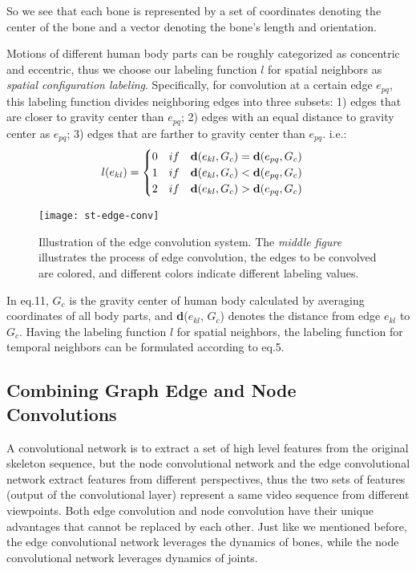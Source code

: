 \documentclass[a4paper,11pt]{article}
\begin{document}
So we see that each bone is represented by a set of coordinates denoting the center of the bone and a vector denoting the bone's length and orientation.

Motions of different human body parts can be roughly categorized as concentric and eccentric, thus we choose our labeling function $l$ for spatial neighbors as {\it spatial configuration labeling}. Specifically, for convolution at a certain edge $e_{pq}$, this labeling function divides neighboring edges into three subsets: 1) edges that are closer to gravity center than $e_{pq}$; 2) edges with an equal distance to gravity center as $e_{pq}$; 3) edges that are farther to gravity center than $e_{pq}$. i.e.:
\begin{equation} l(e_{kl})=
\begin{cases}
0 \quad if \quad {\bf d}(e_{kl}, G_c) = {\bf d}(e_{pq}, G_c)& \\
1 \quad if \quad {\bf d}(e_{kl}, G_c) < {\bf d}(e_{pq}, G_c) & \\
2 \quad if \quad {\bf d}(e_{kl}, G_c) > {\bf d}(e_{pq}, G_c)
\end{cases}
\end{equation}





\begin{figure*}
\centering
\texttt{[image: st-edge-conv]}
\caption{Illustration of the edge convolution system. The {\it middle figure} illustrates the process of edge convolution, the edges to be convolved are colored, and different colors indicate different labeling values.}
\label{fig:example}
\end{figure*}


In eq.11, $G_c$ is the gravity center of human body calculated by averaging coordinates of all body parts, and {\bf d}($e_{kl}$, $G_c$) denotes the distance from edge $e_{kl}$ to $G_c$. Having the labeling function $l$ for spatial neighbors, the labeling function for temporal neighbors can be formulated according to eq.5.

\subsection{Combining Graph Edge and Node Convolutions}
 
A convolutional network is to extract a set of high level features from the original skeleton sequence, but the node convolutional network and the edge convolutional network extract features from different perspectives, thus the two sets of features (output of the convolutional layer) represent a same video sequence from different viewpoints. Both edge convolution and node convolution have their unique advantages that cannot be replaced by each other. Just like we mentioned before, the edge convolutional network leverages the dynamics of bones, while the node convolutional network leverages dynamics of joints. 
\end{document}
